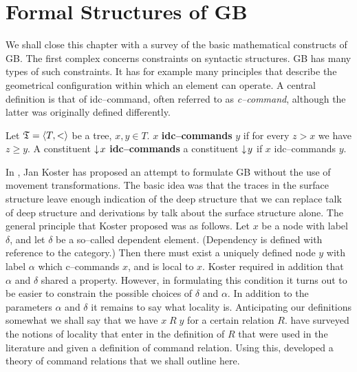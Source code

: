 \section{Formal Structures of GB}
\label{kap5-7}
%
%
%
We shall close this chapter with a survey of the basic mathematical
constructs of GB. The first complex concerns constraints on syntactic 
structures. GB has many types of such constraints. It has for example 
many principles that describe the geometrical configuration within 
which an element can operate. A central definition is that of 
idc--command, often referred to as {\it c--command}, although the 
latter was originally defined differently.
\begin{defn}
Let $\mathfrak{T} = \langle T, <\rangle$ be a tree, $x, y \in T$. $x$ 
\textbf{idc--commands} $y$ if for every $z > x$ we have $z \geq y$. 
A constituent ${\downarrow\! x}$ \textbf{idc--commands} a constituent ${\downarrow\! y}$ 
if $x$ idc--commands $y$.
\end{defn}
In , Jan Koster has proposed an attempt to
formulate GB without the use of movement transformations. The basic
idea was that the traces in the surface structure leave enough
indication of the deep structure that we can replace talk of deep
structure and derivations by talk about the surface structure
alone. The general principle that Koster proposed was as follows.
Let $x$ be a node with label $\delta$, and let $\delta$
be a so--called dependent element. (Dependency is 
defined with reference to the category.) Then there must
exist a uniquely defined node $y$ with label $\alpha$
which c--commands $x$, and is local to $x$. Koster required
in addition that $\alpha$ and $\delta$ shared a property.
However, in formulating this condition it turns out to be
easier to constrain the possible choices of $\delta$ and $\alpha$.
In addition to the parameters $\alpha$ and $\delta$ it
remains to say what locality is. Anticipating our definitions
somewhat we shall say that we have $x\; R\; y$ for a certain
relation $R$. \cite{barkerpullum:command} have surveyed the notions of
locality that enter in the definition of $R$ that were used in
the literature and given a definition of command relation.
Using this, \cite{kracht:aspects} developed a theory
of command relations that we shall outline here.
